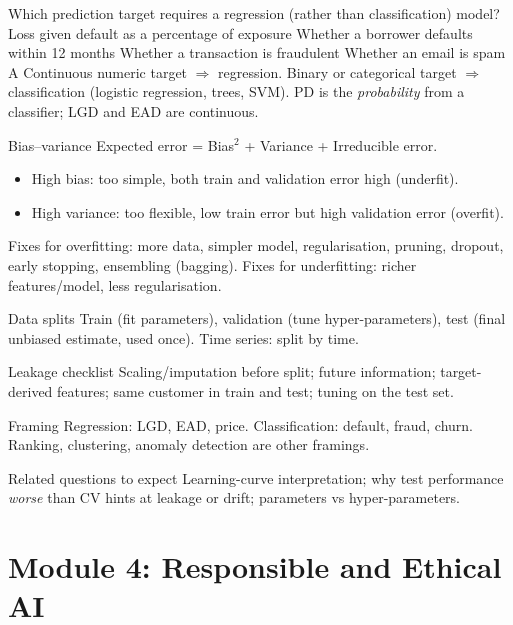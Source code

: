 {Which prediction target requires a regression (rather than classification) model?}
{Loss given default as a percentage of exposure}
{Whether a borrower defaults within 12 months}
{Whether a transaction is fraudulent}
{Whether an email is spam}
{A}
{Continuous numeric target $\Rightarrow$ regression. Binary or categorical target $\Rightarrow$ classification (logistic regression, trees, SVM). PD is the \emph{probability} from a classifier; LGD and EAD are continuous.}

{\begin{block}{Bias--variance}
		Expected error = Bias$^2$ + Variance + Irreducible error.
		\begin{itemize}
			\item High bias: too simple, both train and validation error high (underfit).
			\item High variance: too flexible, low train error but high validation error (overfit).
		\end{itemize}
		Fixes for overfitting: more data, simpler model, regularisation, pruning, dropout, early stopping, ensembling (bagging). Fixes for underfitting: richer features/model, less regularisation.
	\end{block}
	\begin{block}{Data splits}
		Train (fit parameters), validation (tune hyper-parameters), test (final unbiased estimate, used once). Time series: split by time.
\end{block}}
{\begin{block}{Leakage checklist}
		Scaling/imputation before split; future information; target-derived features; same customer in train and test; tuning on the test set.
	\end{block}
	\begin{block}{Framing}
		Regression: LGD, EAD, price. Classification: default, fraud, churn. Ranking, clustering, anomaly detection are other framings.
	\end{block}
	\begin{alertblock}{Related questions to expect}
		Learning-curve interpretation; why test performance \emph{worse} than CV hints at leakage or drift; parameters vs hyper-parameters.
\end{alertblock}}

\section{Module 4: Responsible and Ethical AI}


